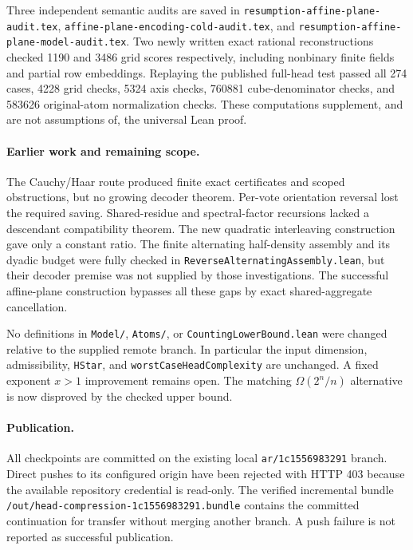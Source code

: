 \documentclass[11pt]{article}
\begin{document}
Three independent semantic audits are saved in
\texttt{resumption-affine-plane-audit.tex},
\texttt{affine-plane-encoding-cold-audit.tex}, and
\texttt{resumption-affine-plane-model-audit.tex}.
Two newly written exact rational reconstructions checked 1190 and 3486 grid
scores respectively, including nonbinary finite fields and partial row
embeddings. Replaying the published full-head test passed all 274 cases,
4228 grid checks, 5324 axis checks, 760881 cube-denominator checks, and
583626 original-atom normalization checks. These computations supplement,
and are not assumptions of, the universal Lean proof.

\paragraph{Earlier work and remaining scope.}
The Cauchy/Haar route produced finite exact certificates and scoped
obstructions, but no growing decoder theorem. Per-vote orientation
reversal lost the required saving. Shared-residue and spectral-factor
recursions lacked a descendant compatibility theorem. The new quadratic
interleaving construction gave only a constant ratio. The finite alternating
half-density assembly and its dyadic budget were fully checked in
\texttt{ReverseAlternatingAssembly.lean}, but their decoder premise was
not supplied by those investigations. The successful affine-plane
construction bypasses all these gaps by exact shared-aggregate cancellation.

No definitions in \texttt{Model/}, \texttt{Atoms/}, or
\texttt{CountingLowerBound.lean} were changed relative to the supplied
remote branch. In particular the input dimension, admissibility,
\texttt{HStar}, and \texttt{worstCaseHeadComplexity} are unchanged.
A fixed exponent $x>1$ improvement remains open. The matching
$\Omega(2^n/n)$ alternative is now disproved by the checked upper bound.

\paragraph{Publication.}
All checkpoints are committed on the existing local
\texttt{ar/1c1556983291} branch. Direct pushes to its configured origin have
been rejected with HTTP 403 because the available repository credential
is read-only. The verified incremental bundle
\texttt{/out/head-compression-1c1556983291.bundle} contains the committed
continuation for transfer without merging another branch. A push failure
is not reported as successful publication.
\end{document}
